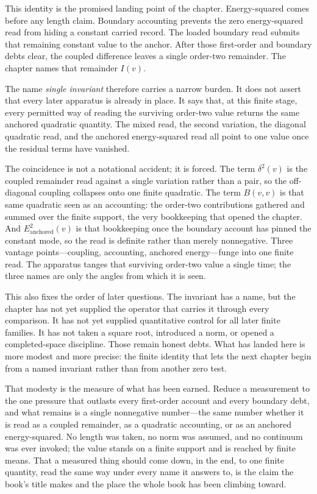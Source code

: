 This identity is the promised landing point of the chapter. Energy-squared
comes before any length claim. Boundary accounting prevents the zero
energy-squared read from hiding a constant carried record. The loaded boundary
read submits that remaining constant value to the anchor. After those
first-order and boundary debts clear, the coupled difference leaves a single
order-two remainder. The chapter names that remainder \(I(v)\).

The name \emph{single invariant} therefore carries a narrow burden. It does not
assert that every later apparatus is already in place. It says that, at
this finite stage, every permitted way of reading the surviving order-two value
returns the same anchored quadratic quantity. The mixed read, the second
variation, the diagonal quadratic read, and the anchored energy-squared read
all point to one value once the residual terms have vanished.

The coincidence is not a notational accident; it is forced. The term
\(\delta^2(v)\) is the coupled remainder read against a single variation rather
than a pair, so the off-diagonal coupling collapses onto one finite quadratic.
The term \(B(v,v)\) is that same quadratic seen as an accounting: the order-two
contributions gathered and summed over the finite support, the very bookkeeping
that opened the chapter. And \(E^2_{\mathrm{anchored}}(v)\) is that bookkeeping
once the boundary account has pinned the constant mode, so the read is definite
rather than merely nonnegative. Three vantage points---coupling, accounting,
anchored energy---funge into one finite read. The apparatus tanges that
surviving order-two value a single time; the three names are only the angles
from which it is seen.

This also fixes the order of later questions. The invariant has a name, but
the chapter has not yet supplied the operator that carries it through every
comparison. It has not yet supplied quantitative control for all later finite
families. It has not taken a square root, introduced a norm, or opened a
completed-space discipline. Those remain honest debts. What has landed here is
more modest and more precise: the finite identity that lets the next chapter
begin from a named invariant rather than from another zero test.

That modesty is the measure of what has been earned. Reduce a measurement to
the one pressure that outlasts every first-order account and every boundary
debt, and what remains is a single nonnegative number---the same number whether
it is read as a coupled remainder, as a quadratic accounting, or as an anchored
energy-squared. No length was taken, no norm was assumed, and no continuum was
ever invoked; the value stands on a finite support and is reached by finite
means. That a measured thing should come down, in the end, to one finite
quantity, read the same way under every name it answers to, is the claim the
book's title makes and the place the whole book has been climbing toward.

